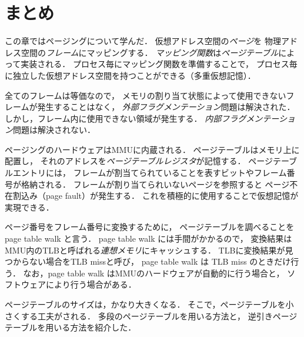 \section{まとめ}
この章ではページングについて学んだ．
仮想アドレス空間の\emph{ページ}を
物理アドレス空間の\emph{フレーム}にマッピングする．
\emph{マッピング関数}は\emph{ページテーブル}によって実装される．
プロセス毎にマッピング関数を準備することで，
プロセス毎に独立した仮想アドレス空間を持つことができる（多重仮想記憶）．

全てのフレームは等価なので，
メモリの割り当て状態によって使用できないフレームが発生することはなく，
\emph{外部フラグメンテーション}問題は解決された．
しかし，フレーム内に使用できない領域が発生する．
\emph{内部フラグメンテーション}問題は解決されない．

ページングのハードウェアはMMUに内蔵される．
ページテーブルはメモリ上に配置し，
それのアドレスを\emph{ページテーブルレジスタ}が記憶する．
ページテーブルエントリには，
フレームが割当てられていることを表すビットやフレーム番号が格納される．
フレームが割り当てられいないページを参照すると
ページ不在割込み（page fault）が発生する．
これを積極的に使用することで仮想記憶が実現できる．

ページ番号をフレーム番号に変換するために，
ページテーブルを調べることを page table walk と言う．
page table walk には手間がかかるので，
変換結果はMMU内のTLBと呼ばれる\emph{連想メモリ}にキャッシュする．
TLBに変換結果が見つからない場合をTLB missと呼び，
page table walk は TLB miss のときだけ行う．
なお，page table walk はMMUのハードウェアが自動的に行う場合と，
ソフトウェアにより行う場合がある．

ページテーブルのサイズは，かなり大きくなる．
そこで，ページテーブルを小さくする工夫がされる．
多段のページテーブルを用いる方法と，
逆引きページテーブルを用いる方法を紹介した．

\newpage
